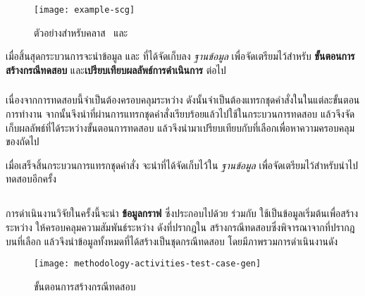 \begin{figure}
    \centering
    \texttt{[image: example-scg]}
    \caption{ตัวอย่าง{\scg}สำหรับคลาส ~และ~}
    \label{fig:exampleSCG}
\end{figure}

เมื่อสิ้นสุดกระบวนการจะนำข้อมูล{\bf {\scg}} และ{\bf {\cfg}} ที่ได้จัดเก็บลง {\it ฐานข้อมูล} เพื่อจัดเตรียมไว้สำหรับ 
{\bf ขั้นตอนการสร้างกรณีทดสอบ} และ{\bf เปรียบเทียบผลลัพธ์การดำเนินการ} ต่อไป

\subsubsection{\sourcecodeInstrumention}
\label{sec:sub:sub:srcInstrument}

เนื่องจากการทดสอบนี้จำเป็นต้องครอบคลุม{\Path}ระหว่าง{\CUT} ดังนั้นจำเป็นต้องแทรกชุดคำสั่งใน{\sourcecode}ในแต่ละขั้นตอนการทำงาน 
จากนั้นจึงนำ{\sourcecode}ที่ผ่านการแทรกชุดคำสั่งเรียบร้อยแล้วไปใช้ในกระบวนการทดสอบ 
แล้วจึงจัดเก็บผลลัพธ์ที่ได้ระหว่างขั้นตอนการทดสอบ แล้วจึงนำมาเปรียบเทียบกับ{\TestPath}ที่เลือกเพื่อหาความครอบคลุมของ{\scg}ถัดไป

เมื่อเสร็จสิ้นกระบวนการแทรกชุดคำสั่ง จะนำ{\sourcecode}ที่ได้จัดเก็บไว้ใน {\it ฐานข้อมูล} เพื่อจัดเตรียมไว้สำหรับนำไปทดสอบอีกครั้ง

\subsection{\testcaseGeneration}
\label{sec:sub:tcg}

การดำเนินงานวิจัยในครั้งนี้จะนำ {\bf ข้อมูลกราฟ} ซึ่งประกอบไปด้วย {\it {\scg}} ร่วมกับ{\it {\cfg}} ใช้เป็นข้อมูลเริ่มต้นเพื่อสร้าง{\TestPath}
ระหว่าง{\CUT} ให้ครอบคลุมความสัมพันธ์ระหว่าง{\class} ดังที่ปรากฎใน{\scg} 
สร้างกรณีทดสอบซึ่งพิจารณาจาก{\PredicateNode}ที่ปรากฎบน{\TestPath}ที่เลือก แล้วจึงนำข้อมูลทั้งหมดที่ได้สร้างเป็นชุดกรณีทดสอบ 
โดยมีภาพรวมการดำเนินงานดัง 

\begin{figure}[ht!]
    \centering
    \texttt{[image: methodology-activities-test-case-gen]}
    \caption{ขั้นตอนการสร้างกรณีทดสอบ}
    \label{fig:testcaseGenerationActivity}
\end{figure}

